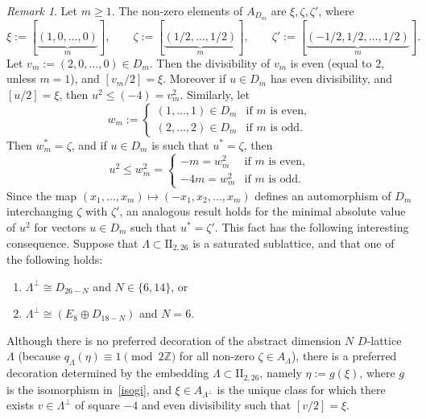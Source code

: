 \documentclass[11pt]{amsart}
\numberwithin{equation}{subsection}
\theoremstyle{plain}
\theoremstyle{remark}
\newtheorem{remark}[theorem]{Remark}
\theoremstyle{definition}
\newcommand{\II}{\textrm{II}}
\newcommand{\ZZ}{{\mathbb Z}}
\begin{document}
\begin{remark}\label{rmk:emmequattro}
%
Let $m\ge 1$. The non-zero elements of $ A_{D_m}$ are $\xi,\zeta,\zeta'$, where
%
\begin{equation*}
%
\xi:=[\underbrace{(1,0,\ldots,0)}_{m}],\qquad \zeta:=[\underbrace{(1/2,\ldots,1/2)}_{m}],\qquad \zeta':=[\underbrace{(-1/2,1/2,\ldots,1/2)}_{m}].
%
\end{equation*}
%
Let $v_m:=(2,0,\ldots,0)\in D_m$. Then the divisibility of $v_m$ is even (equal to $2$, unless $m=1$), and $[v_m/2]=\xi$. Moreover if $u\in D_m$ 
has even divisibility, and $[u/2]=\xi$, then $u^2\le(-4)=v_m^2$. Similarly, let
%
\begin{equation*}
%
w_m:=
%
\begin{cases}
%
(1,\ldots,1)\in D_m & \text{if $m$ is even,} \\
%
(2,\ldots,2)\in D_m & \text{if $m$ is odd.}
%
\end{cases}
%
\end{equation*}
%
Then $w^{*}_m=\zeta$, and if $u\in D_m$ is such that $u^{*}=\zeta$, then 
%
\begin{equation*}
%
u^2\le w_m^2= 
%
\begin{cases}
%
-m=w_m^2 & \text{if $m$ is even,} \\
%
-4m=w_m^2  & \text{if $m$ is odd.}
%
\end{cases}
%
\end{equation*}
%
Since the map $(x_1,\ldots,x_m)\mapsto (-x_1,x_2,\ldots,x_m)$ defines an automorphism of $D_m$ interchanging $\zeta$ with $\zeta'$, an analogous result holds for the minimal absolute value of $u^2$ for vectors $u\in D_m$ such that $u^{*}=\zeta'$. 
 This fact has the following interesting consequence. Suppose that 
  $\Lambda\subset\II_{2,26}$ is a saturated sublattice, and that one of the following holds:
%
\begin{enumerate}
%
\item
%
$\Lambda^{\bot}\cong D_{26-N}$ and $N\in\{6,14\}$, or
%
\item
%
$\Lambda^{\bot}\cong (E_8\oplus D_{18-N})$ and $N=6$.
% 
\end{enumerate}
%
Although there is no preferred decoration of the abstract dimension $N$ $D$-lattice $\Lambda$ (because  $q_{\Lambda}(\eta)\equiv 1\pmod{2\ZZ}$ for all non-zero $\zeta\in A_{\Lambda}$),  
 there is a preferred  decoration determined by the embedding $\Lambda\subset\II_{2,26}$, namely  $\eta:=g(\xi)$, where  $g$ is the isomorphism in~\eqref{isogi},
 and  $\xi\in A_{\Lambda^{\bot}}$ is the 
 unique class for which there exists $v\in\Lambda^{\bot}$ of square $-4$ and even divisibility such that $[v/2]=\xi$.
%
\end{remark}
\end{document}
